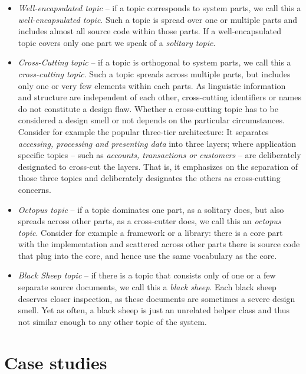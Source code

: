 \documentclass[10pt]{book}
\begin{document}
\begin{itemize}
  \item \emph{Well-encapsulated topic} -- if a topic corresponds to system parts, we call this a \emph{well-encapsulated topic}. Such a topic is spread over one or multiple parts and includes almost all source code within those parts. If a well-encapsulated topic covers only one part we speak of a \emph{solitary topic}.

  \item \emph{Cross-Cutting topic} -- if a topic is orthogonal to system parts, we call this a \emph{cross-cutting topic}. Such a topic spreads across multiple parts, but includes only one or very few elements within each parts. As linguistic information and structure are independent of each other, cross-cutting identifiers or names do not constitute a design flaw. Whether a cross-cutting topic has to be considered a design smell or not depends on the particular circumstances. Consider for example the popular three-tier architecture: It separates \emph{accessing, processing \emph{and} presenting data} into three layers; where application specific topics -- such as \eg \emph{accounts, transactions \emph{or} customers} -- are deliberately designated to cross-cut the layers. That is, it emphasizes on the separation of those three topics and deliberately designates the others as cross-cutting concerns.

 \item \emph{Octopus topic} -- if a topic dominates one part, as a solitary does, but also spreads across other parts, as a cross-cutter does, we call this an \emph{octopus topic}. Consider for example a framework or a library: there is a core part with the implementation and scattered across other parts there is source code that plug into the core, and hence use the same vocabulary as the core.

  \item \emph{Black Sheep topic} -- if there is a topic that consists only of one or a few separate source documents, we call this a \emph{black sheep}. Each black sheep deserves closer inspection, as these documents are sometimes a severe design smell. Yet as often, a black sheep is just an unrelated helper class and thus not similar enough to any other topic of the system.
\end{itemize}

\section{Case studies}\label{sec:validation}
\end{document}
